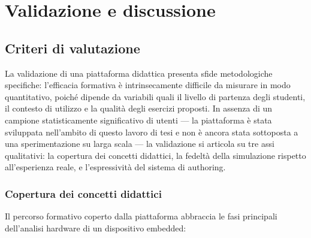 \chapter{Validazione e discussione}
\label{ch:validazione}

\section{Criteri di valutazione}
\label{sec:criteri-valutazione}

La validazione di una piattaforma didattica presenta sfide metodologiche specifiche: l'efficacia formativa è intrinsecamente difficile da misurare in modo quantitativo, poiché dipende da variabili quali il livello di partenza degli studenti, il contesto di utilizzo e la qualità degli esercizi proposti. In assenza di un campione statisticamente significativo di utenti --- la piattaforma è stata sviluppata nell'ambito di questo lavoro di tesi e non è ancora stata sottoposta a una sperimentazione su larga scala --- la validazione si articola su tre assi qualitativi: la copertura dei concetti didattici, la fedeltà della simulazione rispetto all'esperienza reale, e l'espressività del sistema di authoring.

\subsection{Copertura dei concetti didattici}

Il percorso formativo coperto dalla piattaforma abbraccia le fasi principali dell'analisi hardware di un dispositivo embedded:

